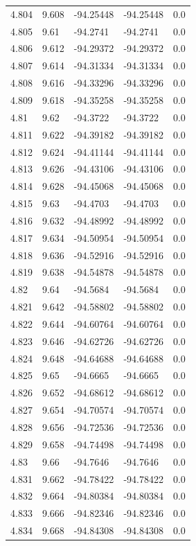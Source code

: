\begin{tabular}{lllll}
4.804 & 9.608 & -94.25448 & -94.25448 & 0.0 \\
4.805 & 9.61 & -94.2741 & -94.2741 & 0.0 \\
4.806 & 9.612 & -94.29372 & -94.29372 & 0.0 \\
4.807 & 9.614 & -94.31334 & -94.31334 & 0.0 \\
4.808 & 9.616 & -94.33296 & -94.33296 & 0.0 \\
4.809 & 9.618 & -94.35258 & -94.35258 & 0.0 \\
4.81 & 9.62 & -94.3722 & -94.3722 & 0.0 \\
4.811 & 9.622 & -94.39182 & -94.39182 & 0.0 \\
4.812 & 9.624 & -94.41144 & -94.41144 & 0.0 \\
4.813 & 9.626 & -94.43106 & -94.43106 & 0.0 \\
4.814 & 9.628 & -94.45068 & -94.45068 & 0.0 \\
4.815 & 9.63 & -94.4703 & -94.4703 & 0.0 \\
4.816 & 9.632 & -94.48992 & -94.48992 & 0.0 \\
4.817 & 9.634 & -94.50954 & -94.50954 & 0.0 \\
4.818 & 9.636 & -94.52916 & -94.52916 & 0.0 \\
4.819 & 9.638 & -94.54878 & -94.54878 & 0.0 \\
4.82 & 9.64 & -94.5684 & -94.5684 & 0.0 \\
4.821 & 9.642 & -94.58802 & -94.58802 & 0.0 \\
4.822 & 9.644 & -94.60764 & -94.60764 & 0.0 \\
4.823 & 9.646 & -94.62726 & -94.62726 & 0.0 \\
4.824 & 9.648 & -94.64688 & -94.64688 & 0.0 \\
4.825 & 9.65 & -94.6665 & -94.6665 & 0.0 \\
4.826 & 9.652 & -94.68612 & -94.68612 & 0.0 \\
4.827 & 9.654 & -94.70574 & -94.70574 & 0.0 \\
4.828 & 9.656 & -94.72536 & -94.72536 & 0.0 \\
4.829 & 9.658 & -94.74498 & -94.74498 & 0.0 \\
4.83 & 9.66 & -94.7646 & -94.7646 & 0.0 \\
4.831 & 9.662 & -94.78422 & -94.78422 & 0.0 \\
4.832 & 9.664 & -94.80384 & -94.80384 & 0.0 \\
4.833 & 9.666 & -94.82346 & -94.82346 & 0.0 \\
4.834 & 9.668 & -94.84308 & -94.84308 & 0.0 \\

\end{tabular}
